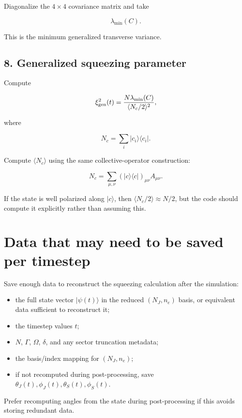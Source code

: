 \documentclass[11pt]{article}
\begin{document}
Diagonalize the \(4\times4\) covariance matrix and take

\begin{equation}
\lambda_{\min}(C).
\end{equation}

This is the minimum generalized transverse variance.

\subsection*{8. Generalized squeezing parameter}

Compute

\begin{equation}
\xi^2_{\rm gen}(t)
=
\frac{N\lambda_{\min}(C)}
{\langle N_c/2\rangle^2},
\end{equation}

where

\begin{equation}
N_c =
\sum_i |c_i\rangle\langle c_i|.
\end{equation}

Compute \(\langle N_c\rangle\) using the same collective-operator construction:

\begin{equation}
N_c =
\sum_{\mu,\nu}
(|c\rangle\langle c|)_{\mu\nu} A_{\mu\nu}.
\end{equation}

If the state is well polarized along \(|c\rangle\), then
\(\langle N_c/2\rangle\approx N/2\), but the code should compute it explicitly
rather than assuming this.

\section*{Data that may need to be saved per timestep}

Save enough data to reconstruct the squeezing calculation after the simulation:

\begin{itemize}
\item the full state vector \(|\psi(t)\rangle\) in the reduced \((N_J,n_e)\)
  basis, or equivalent data sufficient to reconstruct it;
\item the timestep values \(t\);
\item \(N\), \(\Gamma\), \(\Omega\), \(\delta\), and any sector truncation
  metadata;
\item the basis/index mapping for \((N_J,n_e)\);
\item if not recomputed during post-processing, save
  \(\theta_J(t),\phi_J(t),\theta_S(t),\phi_S(t)\).
\end{itemize}

Prefer recomputing angles from the state during post-processing if this avoids
storing redundant data.
\end{document}
